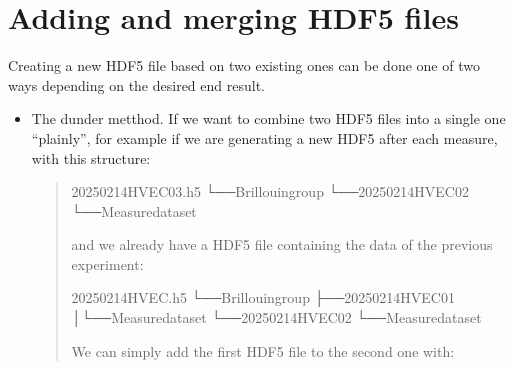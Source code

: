\documentclass[letterpaper,10pt,english]{sphinxmanual}
\begin{document}
\section{Adding and merging HDF5 files}
\label{\detokenize{source/hdf5_bls_package:adding-and-merging-hdf5-files}}
\sphinxAtStartPar
Creating a new HDF5 file based on two existing ones can be done one of two ways depending on the desired end result.
\begin{itemize}
\item {} 
\sphinxAtStartPar
The  dunder metthod. If we want to combine two HDF5 files into a single one “plainly”, for example if we are generating a new HDF5 after each measure, with this structure:
\begin{quote}

\begin{sphinxVerbatim}[commandchars=\\\{\}]
20250214\PYGZus{}HVEC\PYGZus{}03.h5
└──Brillouingroup
└──20250214\PYGZus{}HVEC\PYGZus{}02
└──Measuredataset
\end{sphinxVerbatim}

\sphinxAtStartPar
and we already have a HDF5 file containing the data of the previous experiment:

\begin{sphinxVerbatim}[commandchars=\\\{\}]
20250214\PYGZus{}HVEC.h5
└──Brillouingroup
├──20250214\PYGZus{}HVEC\PYGZus{}01
│└──Measuredataset
└──20250214\PYGZus{}HVEC\PYGZus{}02
└──Measuredataset
\end{sphinxVerbatim}

\sphinxAtStartPar
We can simply add the first HDF5 file to the second one with:

\begin{sphinxVerbatim}[commandchars=\\\{\}]
    
    
    
\end{sphinxVerbatim}


\end{quote}
\end{itemize}
\end{document}
